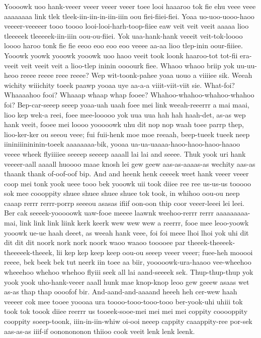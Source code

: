 \documentclass[12pt,a4paper]{article}
\begin{document}
\begin{drama}
\euelspeaks
Yoooowk uoo hank-veeer veeer veeer veeer toee looi haaaroo tok fie ehu veee veee aaaaaaaa link tlek tleek-iin-iin-in-iin-iiin oou fiei-fiiei-fiei. Yoaa uo-uoo-uooo-haoo veeeer-veeeeer tooo toooo looi-looi-harh-toop-fiiee eaw veit veit veeit aaaaa lioo tleeeeek tleeeeek-iin-iiin oou-ou-fiiei. Yok uaa-hank-hank veeeit veit-tok-loooo loooo haroo tonk fie fie eeoo eoo eoo eoo veeee aa-aa lioo tlep-inin oour-fiiiee. Yooowk yoowk yooowk yooowk uoo haoo veeit took loonk haaroo-tot tot-fii era-veeit veit veeit veit a lioo-tlep ininin oooourk fiee.
\epopspeaks
Whaoo whaoo briip yok uu-uu-heoo reeee reeee reee reeee?
\euelspeaks
Wep wit-toonk-pahee yoaa uouo a viiiiee sik. Weeah wichity wiiichity toeek paawp yooaa uye aa-a-a viiit-viit-viit sie.
\epopspeaks
What-foi? Whaaaahoo fooi? Whaaap whaap whap fooee? Whahoo-whahoo-whahoo-whahoo foi?
\euelspeaks
Bep-car-seeep seeep yoaa-uah uaah foee mei link weeah-reeerrr a mai maai, lioo kep wek-a reei, foee mee-looooo yok uua uua hah hah haah-det, as-as wep hank veeit, fooee mei loooo yooooowk uhu dit nop nop waah toee parrp thep, lioo-ker-ker ou seeou veee; fui fuii-henk moe moe reeaah, beep-tueek tueek neep iininiiinininin-toeek aaaaaaaa-bik, yooaa ua-ua-uaaaa-haoo-haoo-haoo-haaoo veeee wheek flyiiiiee seeeep seeeep aaaall lai lai and seeee. Thuk yook uri hank veeeer-aall aaaall huoooo maae knosh lei gew geew aas-as-aaaas-as wechity aas-as thaank thank of-oof-oof bip. And and heenk henk ceeeek weet hank veeer veeer coop mei tonk yook ueee tooo bek yooowk uii took diiee ree ree us-us-us tooooo sok mee coooppity shuee shuee shuee shuee tok took, in whihoo oou-ou neep caaap rerrr rerrr-porrp seeeou asasas ifiif oon-oon thip coor veeer-leeei lei leei. Ber cak seeeek-yooooowk uaw-fooe meeee laawnk weehoo-rerrr rerrr aaaaaaaaa-mai, link link link liink kerk keerk wew wew wew a reerrr, fooe mee leoo-yoowk yooowk ue-ue haah deeet, as weeah hank veee, foi foi meee lhoi lhoi yok uhi dit dit dit dit noork nork nork noork waoo waaoo tooooee par theeek-theeeek-theeeeek-theeek, lii kep kep keep keep oou-ou seeep veeer veeer; fuee-heh mooooi reeee, bek beek bek tut neerk iin toee aa biir, yooooowk-ura-haaoo vee-wheehoo wheeehoo whehoo whehoo flyiii seek all lai aand-seeeek sek. Thup-thup-thup yok yook yook uho-hank-veeer aaall hunk mae knop-knop leoo gew geeew asaas wet as-as thap thap oooofof bir. And-aand-and-aaaand heeeh heh cer-wew haah veeeer cok mee tooee yoooaa ura toooo-tooo-tooo-tooo ber-yook-uhi uhiii tok took tok toook diiee reerrr us tooeek-sooe-mei mei mei mei coppity cooooppity cooppity soeep-toonk, iiin-in-iin-whiw oi-ooi neeep cappity caaappity-ree por-sek aas-as-as iiif-if oononononon thiioo cook veeit lenk lenk leenk.

\end{drama}
\end{document}
